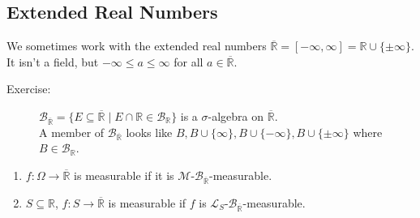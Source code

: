\documentclass[10pt]{extarticle}
\newcommand{\R}{\mathbb{R}}
\begin{document}
  \subsection{Extended Real Numbers}%
  We sometimes work with the extended real numbers $\overline{\R} = [-\infty,\infty] = \R\cup \{\pm \infty\}$. It isn't a field, but $-\infty \leq a \leq \infty$ for all $a\in \overline{\R}$.
  \begin{description}
    \item[Exercise:] $\mathcal{B}_{\overline{\R}}= \{E\subseteq \overline{\R}\mid E\cap \R \in \mathcal{B}_{\R}\}$ is a $\sigma$-algebra on $\overline{\R}$.\\

      A member of $\mathcal{B}_{\overline{\R}}$ looks like $B,B \cup \{\infty\},B\cup \{-\infty\},B\cup \{\pm \infty\}$ where $B\in \mathcal{B}_{\R}$.
  \end{description}
  \begin{enumerate}[(1)]
    \item $f: \Omega \rightarrow \overline{\R}$ is measurable if it is $\mathcal{M}$-$\mathcal{B}_{\overline{\R}}$-measurable.
    \item $S\subseteq \R$, $f: S\rightarrow \overline{\R}$ is measurable if $f$ is $\mathcal{L}_{S}$-$\mathcal{B}_{\overline{\R}}$-measurable.
  \end{enumerate}
\end{document}
